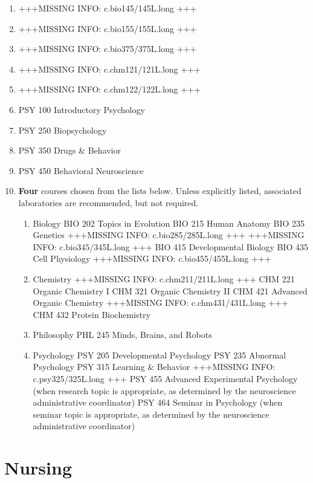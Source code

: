 \documentclass[
  letterpaper,
]{scrbook}
\providecommand{\tightlist}{%
  \setlength{\itemsep}{0pt}\setlength{\parskip}{0pt}}
\begin{document}
\begin{enumerate}
\def\labelenumi{\arabic{enumi}.}
\tightlist
\item
  +++MISSING INFO: c.bio145/145L.long +++
\item
  +++MISSING INFO: c.bio155/155L.long +++
\item
  +++MISSING INFO: c.bio375/375L.long +++
\item
  +++MISSING INFO: c.chm121/121L.long +++
\item
  +++MISSING INFO: c.chm122/122L.long +++
\item
  PSY 100 Introductory Psychology
\item
  PSY 250 Biopsychology
\item
  PSY 350 Drugs \& Behavior
\item
  PSY 450 Behavioral Neuroscience
\item
  \textbf{Four} courses chosen from the lists below. Unless explicitly
  listed, associated laboratories are recommended, but not required.

  \begin{enumerate}
  \def\labelenumii{\alph{enumii}.}
  \tightlist
  \item
    Biology BIO 202 Topics in Evolution BIO 215 Human Anatomy BIO 235
    Genetics +++MISSING INFO: c.bio285/285L.long +++ +++MISSING INFO:
    c.bio345/345L.long +++ BIO 415 Developmental Biology BIO 435 Cell
    Physiology +++MISSING INFO: c.bio455/455L.long +++
  \item
    Chemistry +++MISSING INFO: c.chm211/211L.long +++ CHM 221 Organic
    Chemistry I CHM 321 Organic Chemistry II CHM 421 Advanced Organic
    Chemistry +++MISSING INFO: c.chm431/431L.long +++ CHM 432 Protein
    Biochemistry
  \item
    Philosophy PHL 245 Minds, Brains, and Robots
  \item
    Psychology PSY 205 Developmental Psychology PSY 235 Abnormal
    Psychology PSY 315 Learning \& Behavior +++MISSING INFO:
    c.psy325/325L.long +++ PSY 455 Advanced Experimental Psychology
    (when research topic is appropriate, as determined by the
    neuroscience administrative coordinator) PSY 464 Seminar in
    Psychology (when seminar topic is appropriate, as determined by the
    neuroscience administrative coordinator)
  \end{enumerate}
\end{enumerate}

\section{Nursing}\label{nursing}
\end{document}
